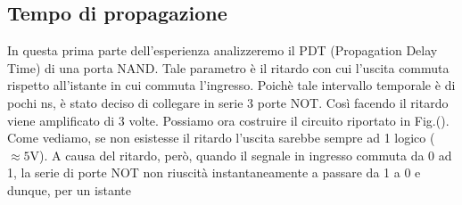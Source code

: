 \subsection*{Tempo di propagazione}
In questa prima parte dell'esperienza analizzeremo il PDT (Propagation Delay Time) di una porta NAND. Tale parametro è il ritardo con cui l'uscita commuta rispetto all'istante in cui commuta l'ingresso. Poichè tale intervallo temporale è di pochi \si{\nano\second}, è stato deciso di collegare in serie 3 porte NOT. Così facendo il ritardo viene amplificato di 3 volte. Possiamo ora costruire il circuito riportato in Fig.(). Come vediamo, se non esistesse il ritardo l'uscita sarebbe sempre ad 1 logico ($\approx 5 \si{\volt}$). A causa del ritardo, però, quando il segnale in ingresso commuta da 0 ad 1, la serie di porte NOT non riuscità instantaneamente a passare da 1 a 0 e dunque, per un istante
